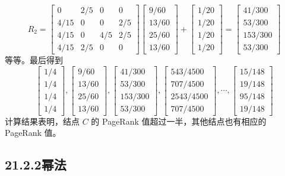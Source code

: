 \documentclass[UTF8,12pt,a4paper,fontset=fandol]{ctexart}
\begin{document}
\[
R_2=
\begin{bmatrix}
0 & 2/5 & 0 & 0\\
4/15 & 0 & 0 & 2/5\\
4/15 & 0 & 4/5 & 2/5\\
4/15 & 2/5 & 0 & 0
\end{bmatrix}
\begin{bmatrix}
9/60\\
13/60\\
25/60\\
13/60
\end{bmatrix}
+
\begin{bmatrix}
1/20\\
1/20\\
1/20\\
1/20
\end{bmatrix}
=
\begin{bmatrix}
41/300\\
53/300\\
153/300\\
53/300
\end{bmatrix}
\]
等等。最后得到
\[
\begin{bmatrix}
1/4\\
1/4\\
1/4\\
1/4
\end{bmatrix},
\begin{bmatrix}
9/60\\
13/60\\
25/60\\
13/60
\end{bmatrix},
\begin{bmatrix}
41/300\\
53/300\\
153/300\\
53/300
\end{bmatrix},
\begin{bmatrix}
543/4500\\
707/4500\\
2543/4500\\
707/4500
\end{bmatrix},
\cdots,
\begin{bmatrix}
15/148\\
19/148\\
95/148\\
19/148
\end{bmatrix}
\]
计算结果表明，结点 $C$ 的 PageRank 值超过一半，其他结点也有相应的 PageRank 值。

\subsection*{21.2.2\quad 幂法}
\end{document}
